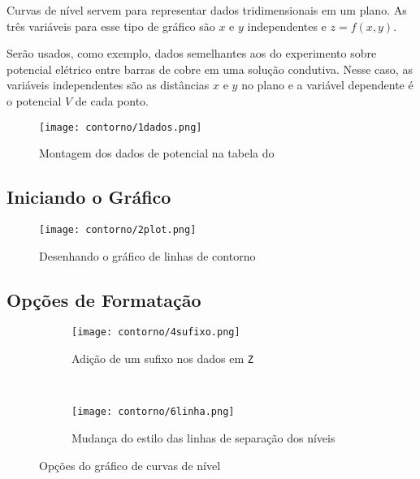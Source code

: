 Curvas de nível servem para representar dados tridimensionais em um plano. As três variáveis para esse tipo de gráfico são $x$ e $y$ independentes e $z = f(x,y)$.

Serão usados, como exemplo, dados semelhantes aos do experimento sobre potencial elétrico entre barras de cobre em uma solução condutiva. Nesse caso, as variáveis independentes são as distâncias $x$ e $y$ no plano e a variável dependente é o potencial $V$ de cada ponto.

\begin{figure}[htbp]
    \centering
    \texttt{[image: contorno/1dados.png]}

    \caption{Montagem dos dados de potencial na tabela do \software}
    \label{fig:contorno:dados}
\end{figure}


\subsection{Iniciando o Gráfico}

    \begin{figure}[htbp]
        \centering
        \texttt{[image: contorno/2plot.png]}

        \caption{Desenhando o gráfico de linhas de contorno}
        \label{fig:contorno:plot}
    \end{figure}

\subsection{Opções de Formatação}

    \begin{figure}[H]
        \centering
        \begin{subfigure}{0.7\textwidth}
            \centering
            \texttt{[image: contorno/4sufixo.png]}

            \caption{Adição de um sufixo nos dados em \texttt{Z}}
            \label{fig:contorno:sufixo}
        \end{subfigure}
        ~
        \begin{subfigure}{0.7\textwidth}
            \centering
            \texttt{[image: contorno/6linha.png]}

            \caption{Mudança do estilo das linhas de separação dos níveis}
            \label{fig:contorno:linhas}
        \end{subfigure}
        \caption{Opções do gráfico de curvas de nível}
        \label{fig:contorno:opcoes}
    \end{figure}


